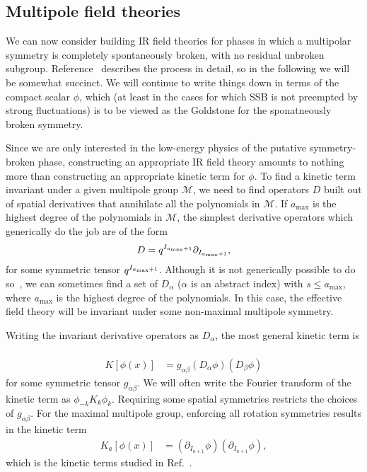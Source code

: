 \documentclass[prb,aps,twocolumn, amsfonts,amsmath,amssymb,nofootinbib,superscriptaddress]{revtex4-2}
\newcommand{\p}{\partial}
\begin{document}
\subsection{Multipole field theories} \label{sub:field}

We can now consider building IR field theories for phases in which a multipolar symmetry is completely spontaneously broken, with no residual unbroken subgroup. Reference~\cite{Gromov2019} describes the process in detail, so in the following we will be somewhat succinct. 
We will continue to write things down in terms of the compact scalar $\phi$, which (at least in the cases for which SSB is not preempted by strong fluctuations) is to be viewed as the Goldstone for the sponatneously broken symmetry. 

Since we are only interested in the low-energy physics of the putative symmetry-broken phase, constructing an appropriate IR field theory amounts to nothing more than constructing an appropriate kinetic term for $\phi$. 
To find a kinetic term invariant under a given multipole group $\mathcal{M}$, we need to find operators $D$ built out of spatial derivatives that annihilate all the polynomials in $\mathcal{M}$. If $a_\text{max}$ is the highest degree of the polynomials in $\mathcal{M}$, the simplest derivative operators which generically do the job are of the form 
\begin{align}
D = q^{I_{a_{\rm max}+1}} \p_{I_{a_{\rm max}+1}},
\end{align}
for some symmetric tensor $q^{I_{a_{\rm max}+1}}$. Although it is not generically possible to do so~\cite{Gromov2019}, we can sometimes find a set of $D_\alpha$ ($\alpha$ is an abstract index) with $s\le a_{\text{max}}$, where $a_\text{max}$ is the highest degree of the polynomials. In this case, the effective field theory will be invariant under some non-maximal multipole symmetry. 

Writing the invariant derivative operators as $D_\alpha$, the most general kinetic term is ~\cite{Gromov2019} 
\begin{align}
K[\phi(x)] &= g_{\alpha\beta} (D_\alpha \phi) (D_\beta \phi)
\end{align}
for some symmetric tensor $g_{\alpha\beta}$.
We will often write the Fourier transform of the kinetic term as $\phi_{-k} K_k \phi_k$.  Requiring some spatial symmetries restricts the choices of $g_{\alpha \beta}$. For the maximal multipole group, enforcing all rotation symmetries results in the kinetic term
\begin{align}
K_a[\phi(x)] &= (\partial_{I_{a+1}} \phi) (\partial_{I_{a+1}} \phi),
\end{align}
which is the kinetic terms studied in Ref.~\cite{Griffin2015}. 
\end{document}
